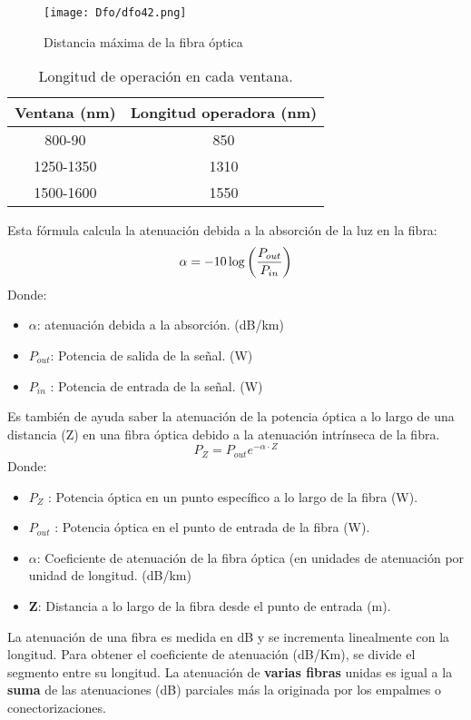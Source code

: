 \documentclass[
	12pt, %
	fleqn, %
	a4paper, %
	oneside, %
]{LegrandOrangeBook}
\begin{document}
\begin{figure}[H]
\centering
\texttt{[image: Dfo/dfo42.png]}
\caption{Distancia máxima de la fibra óptica}
\label{fig:dist max fibra}
\end{figure}
\begin{table}[H]
\centering
\begin{tabular}{|c|c|}
\hline
\rowcolor[HTML]{CBCEFB} 
Ventana (nm) & Longitud operadora (nm) \\ \hline
800-90       & 850                     \\ \hline
1250-1350    & 1310                    \\ \hline
1500-1600    & 1550                    \\ \hline
\end{tabular}
\caption{Longitud de operación en cada ventana.}
\end{table}
Esta fórmula calcula la atenuación debida a la absorción de la luz en la fibra:
\begin{equation}
\alpha = -10\log\left(\frac{P_{out}}{P_{in}}\right)
\end{equation}
Donde:
\begin{itemize}
\item $\alpha$: atenuación debida a la absorción. (dB/km)
\item $P_{out}$: Potencia de salida de la señal. (W)
\item $P_{in}$ : Potencia de entrada	 de la señal.  (W)
\end{itemize}
Es también de ayuda saber la atenuación de la potencia óptica a lo largo de una distancia (Z) en una fibra óptica debido a la atenuación intrínseca de la fibra.
\begin{equation}
P_Z=P_{out}e^{-\alpha\cdot Z}
\end{equation}
Donde:
\begin{itemize}
\item $P_Z$ : Potencia óptica en un punto específico a lo largo de la fibra (W).
\item $P_{out}$ : Potencia óptica en el punto de entrada de la fibra (W).
\item $\alpha$: Coeficiente de atenuación de la fibra óptica (en unidades de atenuación por unidad de longitud. (dB/km)
\item \textbf{Z}: Distancia a lo largo de la fibra desde el punto de entrada (m).
\end{itemize}
La atenuación de una fibra es medida en dB y se incrementa linealmente con la longitud. Para obtener el coeficiente de atenuación (dB/Km), se divide el segmento entre su longitud. La atenuación de \textbf{varias fibras} unidas es igual a la \textbf{suma} de las atenuaciones (dB) parciales más la originada por los empalmes o conectorizaciones.
\end{document}
